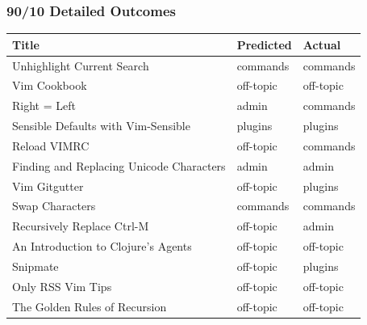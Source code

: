 \documentclass[12pt, a4paper]{article}
\begin{document}
\subsubsection{90/10 Detailed Outcomes}
\begin{tabular}{lll}
\hline
 Title                                    & Predicted   & Actual    \\
\hline
 Unhighlight Current Search               & commands    & commands  \\
 Vim Cookbook                             & off-topic   & off-topic \\
 Right = Left                             & admin       & commands  \\
 Sensible Defaults with Vim-Sensible      & plugins     & plugins   \\
 Reload VIMRC                             & off-topic   & commands  \\
 Finding and Replacing Unicode Characters & admin       & admin     \\
 Vim Gitgutter                            & off-topic   & plugins   \\
 Swap Characters                          & commands    & commands  \\
 Recursively Replace Ctrl-M               & off-topic   & admin     \\
 An Introduction to Clojure's Agents      & off-topic   & off-topic \\
 Snipmate                                 & off-topic   & plugins   \\
 Only RSS Vim Tips                        & off-topic   & off-topic \\
 The Golden Rules of Recursion            & off-topic   & off-topic \\
\hline
\end{tabular}

\newpage
\end{document}

